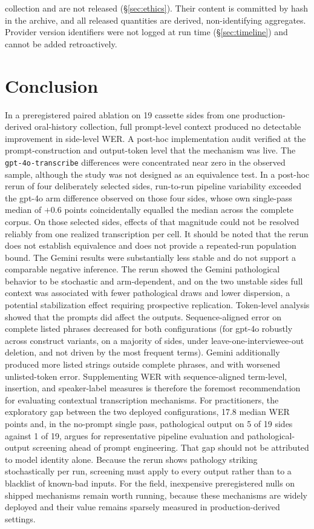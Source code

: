 \documentclass[11pt]{article}
\begin{document}
collection and are not released (\S\ref{sec:ethics}). Their content is committed by hash in the archive, and all released quantities are derived, non-identifying aggregates. Provider version identifiers were not logged at run time (\S\ref{sec:timeline}) and cannot be added retroactively.

\section{Conclusion}
\label{sec:conclusion}

In a preregistered paired ablation on 19 cassette sides from one production-derived oral-history collection, full prompt-level context produced no detectable improvement in side-level WER. A post-hoc implementation audit verified at the prompt-construction and output-token level that the mechanism was live. The \texttt{gpt-4o-transcribe} differences were concentrated near zero in the observed sample, although the study was not designed as an equivalence test. In a post-hoc rerun of four deliberately selected sides, run-to-run pipeline variability exceeded the gpt-4o arm difference observed on those four sides, whose own single-pass median of $+0.6$ points coincidentally equalled the median across the complete corpus. On those selected sides, effects of that magnitude could not be resolved reliably from one realized transcription per cell. It should be noted that the rerun does not establish equivalence and does not provide a repeated-run population bound. The Gemini results were substantially less stable and do not support a comparable negative inference. The rerun showed the Gemini pathological behavior to be stochastic and arm-dependent, and on the two unstable sides full context was associated with fewer pathological draws and lower dispersion, a potential stabilization effect requiring prospective replication. Token-level analysis showed that the prompts did affect the outputs. Sequence-aligned error on complete listed phrases decreased for both configurations (for gpt-4o robustly across construct variants, on a majority of sides, under leave-one-interviewee-out deletion, and not driven by the most frequent terms). Gemini additionally produced more listed strings outside complete phrases, and with worsened unlisted-token error. Supplementing WER with sequence-aligned term-level, insertion, and speaker-label measures is therefore the foremost recommendation for evaluating contextual transcription mechanisms. For practitioners, the exploratory gap between the two deployed configurations, 17.8 median WER points and, in the no-prompt single pass, pathological output on 5 of 19 sides against 1 of 19, argues for representative pipeline evaluation and pathological-output screening ahead of prompt engineering. That gap should not be attributed to model identity alone. Because the rerun shows pathology striking stochastically per run, screening must apply to every output rather than to a blacklist of known-bad inputs. For the field, inexpensive preregistered nulls on shipped mechanisms remain worth running, because these mechanisms are widely deployed and their value remains sparsely measured in production-derived settings.
\end{document}
